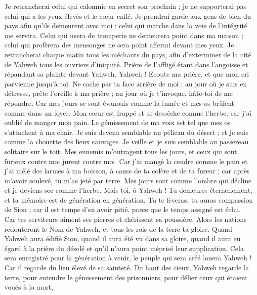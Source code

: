 \begin{multicols}{2}
Je retrancherai celui qui calomnie en secret son prochain ; je ne supporterai pas celui qui a les yeux élevés et le cœur enflé.
Je prendrai garde aux gens de bien du pays afin qu'ils demeurent avec moi ; celui qui marche dans la voie de l'intégrité me servira.
Celui qui usera de tromperie ne demeurera point dans ma maison ; celui qui profèrera des mensonges ne sera point affermi devant mes yeux.
Je retrancherai chaque matin tous les méchants du pays, afin d'exterminer de la cité de Yahweh tous les ouvriers d'iniquité.
\VerseOne{}Prière de l'affligé étant dans l'angoisse et répandant sa plainte devant Yahweh.
Yahweh ! Ecoute ma prière, et que mon cri parvienne jusqu'à toi.
Ne cache pas ta face arrière de moi ; au jour où je suis en détresse, prête l'oreille à ma prière ; au jour où je t'invoque, hâte-toi de me répondre.
Car mes jours se sont évanouis comme la fumée et mes os brûlent comme dans un foyer.
Mon cœur est frappé et se dessèche comme l'herbe, car j'ai oublié de manger mon pain.
Le gémissement de ma voix est tel que mes os s'attachent à ma chair.
Je suis devenu semblable au pélican du désert ; et je suis comme la chouette des lieux sauvages.
Je veille et je suis semblable au passereau solitaire sur le toit.
Mes ennemis m'outragent tous les jours, et ceux qui sont furieux contre moi jurent contre moi.
Car j'ai mangé la cendre comme le pain et j'ai mêlé des larmes à ma boisson,
à cause de ta colère et de ta fureur ; car après m'avoir soulevé, tu m'as jeté par terre.
Mes jours sont comme l'ombre qui décline et je deviens sec comme l'herbe.
Mais toi, ô Yahweh ! Tu demeures éternellement, et ta mémoire est de génération en génération.
Tu te lèveras, tu auras compassion de Sion ; car il est temps d'en avoir pitié, parce que le temps assigné est échu.
Car tes serviteurs aiment ses pierres et chérissent sa poussière.
Alors les nations redouteront le Nom de Yahweh, et tous les rois de la terre ta gloire.
Quand Yahweh aura édifié Sion, quand il aura été vu dans sa gloire,
quand il aura eu égard à la prière du désolé et qu'il n'aura point méprisé leur supplication.
Cela sera enregistré pour la génération à venir, le peuple qui sera créé louera Yahweh !
Car il regarde du lieu élevé de sa sainteté. Du haut des cieux, Yahweh regarde la terre,
pour entendre le gémissement des prisonniers, pour délier ceux qui étaient voués à la mort,

\end{multicols}
